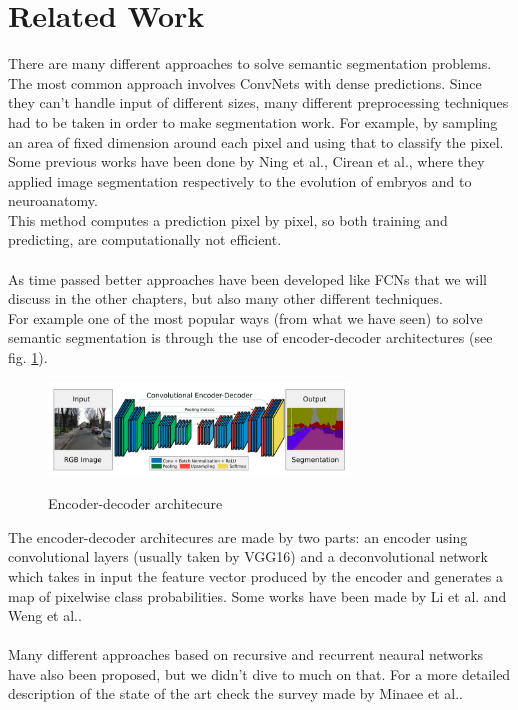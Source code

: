 \documentclass[10pt,twocolumn,letterpaper]{article}
\begin{document}
\section{Related Work}

There are many different approaches to solve semantic segmentation problems. The most common approach involves ConvNets with dense predictions. Since they can't handle input of different sizes, many different preprocessing techniques had to be taken in order to make segmentation work. For example, by sampling an area of fixed dimension around each pixel and  using that to classify the pixel. Some previous works have been done by Ning et al.\cite{1495508}, Cirean et al.\cite{article}, where they applied image segmentation respectively to the evolution of embryos and to neuroanatomy. \\
This method computes a prediction pixel by pixel, so both training and predicting, are computationally not efficient. \\ \\
As time passed better approaches have been developed like FCNs that we will discuss in the other chapters, but also many other different techniques.\\
For example one of the most popular ways (from what we have seen) to solve semantic segmentation is through the use of encoder-decoder architectures (see fig. \ref{ednet}).
\begin{figure}[t]
	\includegraphics[width=8cm]{image/ednet}
	\label{ednet}
	\centering
	\caption{Encoder-decoder architecure}
\end{figure}
The encoder-decoder architecures are made by two parts: an encoder using convolutional layers (usually taken by VGG16) and a deconvolutional network which takes in input the feature vector produced by the encoder and generates a map of pixelwise class probabilities. Some works have been made by Li et al.\cite{8379359} and Weng et al.\cite{8681706}.\\ \\
Many different approaches based on recursive and recurrent neaural networks have also been proposed, but we didn't dive to much on that. For a more detailed description of the state of the art check the survey made by Minaee et al.\cite{unknown}. 
\end{document}
